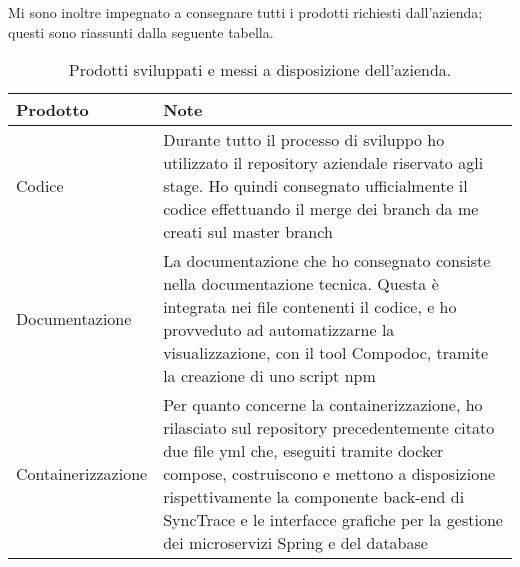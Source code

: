Mi sono inoltre impegnato a consegnare tutti i prodotti richiesti dall'azienda; questi sono riassunti dalla seguente tabella.

\begin{table}[h]
  \begin{center}
  \begin{tabular}{lp{9cm}}
  \textbf{Prodotto}                        & \textbf{Note}                                                                                                                                                                                                                                                                                                                                    \\ \hline
  \multicolumn{1}{|l|}{Codice}             & \multicolumn{1}{p{9cm}|}{Durante tutto il processo di sviluppo ho utilizzato il repository aziendale riservato agli stage. Ho quindi consegnato ufficialmente il codice effettuando il merge dei branch da me creati sul master branch}                                                                                                               \\ \hline
  \multicolumn{1}{|l|}{Documentazione}     & \multicolumn{1}{p{9cm}|}{La documentazione che ho consegnato consiste nella documentazione tecnica. Questa è integrata nei file contenenti il codice, e ho provveduto ad automatizzarne la visualizzazione, con il tool Compodoc, tramite la creazione di uno script npm}                                                                             \\ \hline
  \multicolumn{1}{|l|}{Containerizzazione} & \multicolumn{1}{p{9cm}|}{Per quanto concerne la containerizzazione, ho rilasciato sul repository precedentemente citato due file yml che, eseguiti tramite docker compose, costruiscono e mettono a disposizione rispettivamente la componente back-end di SyncTrace e le interfacce grafiche per la gestione dei microservizi Spring e del database} \\ \hline
  \end{tabular}
\end{center}
\caption{Prodotti sviluppati e messi a disposizione dell'azienda.}
  \end{table}

